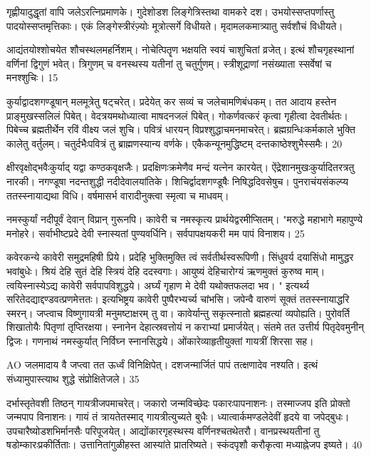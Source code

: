   गृह्णीयादुद्धृतां वापि जलेऽरत्निप्रमाणके।
 गुदेशोडश लिङ्गेत्रिस्तथा वामकरे दश।
 उभयोस्सप्तपर्णास्तु पादयोस्सप्तमृत्तिकाः।
 एकं लिङ्गेस्त्रीरंज़्योः मूत्रोत्सर्गे विधीयते।
 मृदामलकमात्र्यातु सर्वशौचं विधीयते।
 
आद्यंतयोश्शोचयेत शौचस्थलमहर्निशम्।
 नोचेत्पितॄण भक्षयति स्वयं चाशुचितां व्रजेत्।
 इत्थं शौचगृहस्थानां वर्णिनां द्विगुणं भवेत्।
 त्रिगुणम् च वनस्थस्य यतीनां तु चतुर्गुणम्।
 स्त्रीशूद्राणां नसंख्याता स्सर्वेषां च मनश्शुचिः।
 15

  कुर्याद्वादशगण्डूषान् मलमूत्रेतु षट्चरेत्।
 प्रदेयेत् कर सव्यं च जलेचामणिबंधकम्।
 तत आदाय हस्तेन प्राङ्मुखस्सलिलं पिबेत्।
 वेदत्रयमथोध्यात्वा माषदनजलं पिबेत्।
 गोकर्णवत्करं कृत्वा गृहीत्वा देवतीर्थतः।
 पिबेच्च ब्रह्मतीर्थेन रविं वीक्ष्य जलं शुचि।
 पवित्रं धारयन् विप्रश्शुद्धाचमनमाचरेत्।
 ब्रह्मग्रन्धिःकर्मकाले भुक्ति कालेतु वर्तुलम्।
 चतुर्दभैःपवित्रं तु ब्राह्मणस्यान्य वर्णके।
 एकैकन्यूनमुद्धिष्टम् दन्तकाष्ठेश्शुभैस्समैः।
 20

  क्षीरवृक्षोद्भवैःकुर्याद् यद्वा कण्ठकवृक्षजैः।
 प्रदक्षिणःक्रमेणैव मन्दं यत्नेन कारयेत्।
 ऐंद्रेशानमुखःकुर्यादितरत्रतु नारकी।
 नगण्डूषा नदन्तशुद्धी नदीदेवालयांतिके।
 शिचिर्द्वादशगण्डूषैः निषिद्धदिवसेषुच।
 पुनराचंयसंकल्प्य ततस्स्नायाद्यथा विधि।
 वर्षमासर्भ वारादीनुक्त्वा स्मृत्वा च माधवम्।
 
नमस्कुर्यां नदीपूर्वं देवान् विप्रान् गुरूनपि।
 कावेरी च नमस्कृत्य प्रार्थयेद्वरमीप्सितम्।
 "मरुद्धे महाभागे महापुण्ये मनोहरे।
 सर्वाभीष्टप्रदे देवी स्नास्यतां पुण्यवर्धिनि।
 सर्वपापक्षयकरी मम पापं विनाशय।
 25

  कवेरकन्ये कावेरी समुद्रमहिषी प्रिये।
 प्रदेहि भुक्तिमुक्ति त्वं सर्वतीर्थस्वरूपिणी।
 सिंधुवर्य दयासिंधो मामुद्धर भवांबुधेः।
 श्रियं देहि सुतं देहि स्त्रियं देहि ददस्वगाः।
 आयुष्यं देहिचारोग्यं ऋणमुक्तं कुरुष्व माम्।
 त्वयिस्नास्येऽद्य कावेरी सर्वपापविशुद्धये।
 अर्घ्यं गृहाण मे देवी यथोक्तफलदा भव।
 " इत्यर्थ्य सरितेदद्याद्दण्डवत्प्रणमेत्ततः।
 इत्यभिष्ट्रय कावेरी पुष्पैरभ्यर्च्य चांभसि।
 जपेन्वै वारुणं सूक्तं ततस्स्नायाद्धरि स्मरन्।
 जप्त्वाच विष्णुगायत्री मनुमष्टाक्षरम् तु वा।
 कावेर्यान्तु सकृत्स्नातो ब्रह्महत्यां व्यपोह्यति।
 पुरोवर्ति शिखातोयैः पितृणां तृप्तिरक्षया।
 स्नानेन देहात्स्रवत्तोयं न कराभ्यां प्रमार्जयेत्।
 संतमे तत उत्तीर्य पितृदेवमुनीन् द्विजः।
 गणनाथं नमस्कुर्यात् निर्विघ्न स्नानसिद्धये।
 ओंकारेव्याहृतीयुक्तां गायत्रीं शिरसा सह।
 
AO
जलमादाय वै जप्त्वा तत ऊर्ध्वं विनिक्षिपेत्।
 दशजन्मार्जितं पापं तत्क्षणादेव नश्यति।
 इत्थं संध्यामुपास्त्याथ शुद्धे संप्रोक्षितेजले।
 35

  दर्भास्तृतेवशी तिष्ठन् गायत्रीजपमाचरेत्।
 जकारो जन्मविच्छेदः पकारःपापनाशनः।
 तस्माज्जप इति प्रोक्तो जन्मपाप विनाशनः।
 गायं तं त्रायतेतस्माद् गायत्रीत्युच्यते बुधैः।
 ध्यात्वार्कमण्डलेदेवीं हृदये वा जपेद्बुधः।
 उपचारैष्योडशभिर्मानसैः परिपूजयेत्।
 आद्योंकारगृहस्थस्य वर्णिनश्चतथेतरौ।
 वानप्रस्थयतीनां तु षडोम्कारःप्रकीर्तिताः।
 उत्तानितांगुळीहस्त आस्यांते प्रातरिष्यते।
 स्कंदपृशौ करौकृत्वा मध्याह्नेजप इष्यते।
 40

